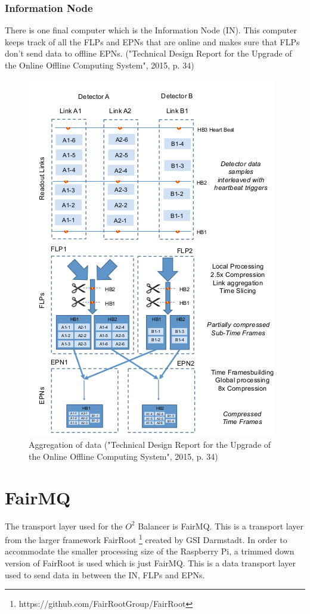 \subsubsection*{Information Node}
There is one final computer which is the Information Node (IN). This computer keeps track of all the FLPs and EPNs that are online and makes sure that FLPs don't send data to offline EPNs. ("Technical Design Report for the Upgrade of the Online Offline Computing System", 2015, p. 34)

\begin{figure}
	\centering
	\includegraphics[scale=1]{./graphics/data_aggregation.png}
	\caption{Aggregation of data ("Technical Design Report for the Upgrade of the Online Offline Computing System", 2015, p. 34)}
\end{figure}

\section{FairMQ}
The transport layer used for the $O^2$ Balancer is FairMQ. This is a transport layer from the larger framework FairRoot \footnote{https://github.com/FairRootGroup/FairRoot} created by GSI Darmstadt. In order to accommodate the smaller processing size of the Raspberry Pi, a trimmed down version of FairRoot is used which is just FairMQ. This is a data transport layer used to send data in between the IN, FLPs and EPNs. 

